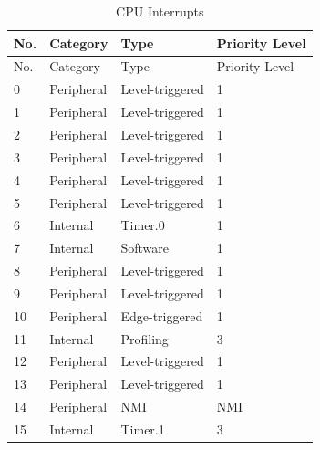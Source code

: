  \begin{longtable}[c]{ |p{1.5cm}|p{4.5cm}|p{4.5cm}|p{4cm}| } 

    \caption{CPU Interrupts}
    \label{table:CPUInterrupt} \\
    \hline
    \rowcolor{lightgray}
   No. & Category     & Type              & Priority Level    \\
    \hline
    \endfirsthead
    
    \hline
    \rowcolor{lightgray}
   No. & Category      & Type             & Priority Level    \\
    \hline
    \endhead
    
    \endfoot
    
    \hline
    \endlastfoot
    
    0   & Peripheral    & Level-triggered   & 1                 \\
    \hline
    1   & Peripheral    & Level-triggered   & 1                 \\
    \hline
    2   & Peripheral    & Level-triggered   & 1                 \\
    \hline
    3   & Peripheral    & Level-triggered   & 1                 \\
    \hline
    4   & Peripheral    & Level-triggered   & 1                 \\
    \hline
    5   & Peripheral    & Level-triggered   & 1                 \\
    \hline
    6   & Internal      & Timer.0           & 1                 \\
    \hline
    7   & Internal      & Software          & 1                 \\
    \hline
    8   & Peripheral    & Level-triggered   & 1                 \\
    \hline
    9   & Peripheral    & Level-triggered   & 1                 \\
    \hline
    10  & Peripheral    & Edge-triggered    & 1                 \\
    \hline
    11  & Internal      & Profiling         & 3                 \\
    \hline
    12  & Peripheral    & Level-triggered   & 1                 \\
    \hline
    13  & Peripheral    & Level-triggered   & 1                 \\
    \hline
    14  & Peripheral    & NMI               & NMI               \\
    \hline
    15  & Internal      & Timer.1           & 3                 \\

\end{longtable}
